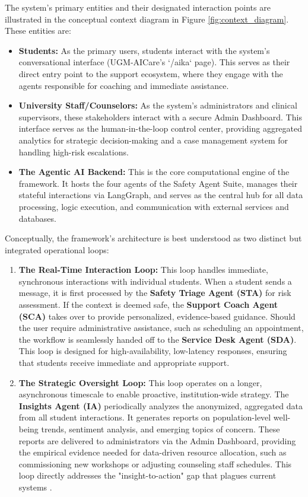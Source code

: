 The system's primary entities and their designated interaction points are illustrated in the conceptual context diagram in Figure \ref{fig:context_diagram}. These entities are:
\begin{itemize}
    \item \textbf{Students:} As the primary users, students interact with the system's conversational interface (UGM-AICare's `/aika` page). This serves as their direct entry point to the support ecosystem, where they engage with the agents responsible for coaching and immediate assistance.
    \item \textbf{University Staff/Counselors:} As the system's administrators and clinical supervisors, these stakeholders interact with a secure Admin Dashboard. This interface serves as the human-in-the-loop control center, providing aggregated analytics for strategic decision-making and a case management system for handling high-risk escalations.
    \item \textbf{The Agentic AI Backend:} This is the core computational engine of the framework. It hosts the four agents of the Safety Agent Suite, manages their stateful interactions via LangGraph, and serves as the central hub for all data processing, logic execution, and communication with external services and databases.
\end{itemize}

Conceptually, the framework's architecture is best understood as two distinct but integrated operational loops:

\begin{enumerate}
    \item \textbf{The Real-Time Interaction Loop:} This loop handles immediate, synchronous interactions with individual students. When a student sends a message, it is first processed by the \textbf{Safety Triage Agent (STA)} for risk assessment. If the context is deemed safe, the \textbf{Support Coach Agent (SCA)} takes over to provide personalized, evidence-based guidance. Should the user require administrative assistance, such as scheduling an appointment, the workflow is seamlessly handed off to the \textbf{Service Desk Agent (SDA)}. This loop is designed for high-availability, low-latency responses, ensuring that students receive immediate and appropriate support.
    \item \textbf{The Strategic Oversight Loop:} This loop operates on a longer, asynchronous timescale to enable proactive, institution-wide strategy. The \textbf{Insights Agent (IA)} periodically analyzes the anonymized, aggregated data from all student interactions. It generates reports on population-level well-being trends, sentiment analysis, and emerging topics of concern. These reports are delivered to administrators via the Admin Dashboard, providing the empirical evidence needed for data-driven resource allocation, such as commissioning new workshops or adjusting counseling staff schedules. This loop directly addresses the "insight-to-action" gap that plagues current systems \cite{FIND_CITATION_HERE}.
\end{enumerate}


